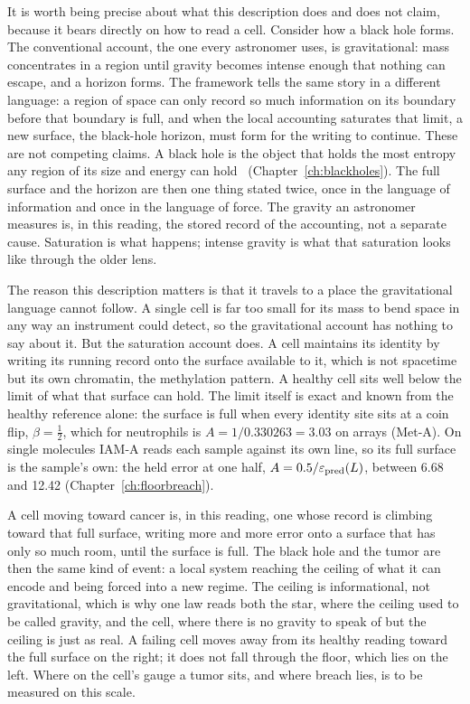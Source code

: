 It is worth being precise about what this description does and does not claim, because it bears directly on how to read a cell. Consider
how a black hole forms. The conventional account, the one every astronomer uses, is gravitational: mass concentrates in a region until
gravity becomes intense enough that nothing can escape, and a horizon forms. The framework tells the same story in a different language: a
region of space can only record so much information on its boundary before that boundary is full, and when the local accounting
saturates that limit, a new surface, the black-hole horizon, must form for the writing to continue. These are not competing claims. A black
hole is the object that holds the most entropy any region of its size and energy can hold~\cite{Bekenstein1981} (Chapter~\ref{ch:blackholes}).
\derived{} The full surface and the horizon are then one thing stated twice, once in the language of information and once in the language
of force. \interp{} The gravity an astronomer measures is, in this reading, the stored record of the accounting, not a separate cause. Saturation is
what happens; intense gravity is what that saturation looks like through the older lens. \interp

The reason this description matters is that it travels to a place the gravitational language cannot follow. A single cell is far too small
for its mass to bend space in any way an instrument could detect, so the gravitational account has nothing to say about it. But the
saturation account does. A cell maintains its identity by writing its running record onto the surface available to it, which is not
spacetime but its own chromatin, the methylation pattern. A healthy cell sits well below the limit of what that surface can hold. The limit
itself is exact and known from the healthy reference alone: the surface is full when every identity site sits at a coin flip,
$\beta=\tfrac12$, which for neutrophils is $A=1/0.330263=3.03$ on arrays (Met-A). On single molecules IAM-A reads each sample against its own line, so its full surface is the sample's own: the held error at one half, $A=0.5/\varepsilon_{\rm pred}(L)$, between 6.68 and 12.42 (Chapter~\ref{ch:floorbreach}). \calc

A cell moving toward cancer is, in this reading, one whose record is climbing toward that full surface, writing more and more error onto
a surface that has only so much room, until the surface is full. The black hole and the tumor
are then the same kind of event: a local system reaching the ceiling of what it can encode and being forced into a new regime. \conjecture{}
The ceiling is informational, not gravitational, which is why one law reads both the star, where the ceiling used to be called gravity,
and the cell, where there is no gravity to speak of but the ceiling is just as real. A failing cell moves away from its healthy reading
toward the full surface on the right; it does not fall through the floor, which lies on the left. Where on the cell's gauge a tumor
sits, and where breach lies, is to be measured on this scale. \openprob

